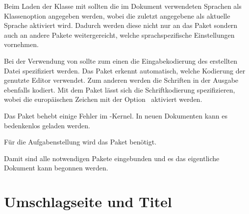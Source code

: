 \documentclass[english,ngerman]{tudscrartcl}
\begin{document}
Beim Laden der Klasse mit  sollten die im Dokument 
verwendeten Sprachen als Klassenoption angegeben werden, wobei die zuletzt 
angegebene als aktuelle Sprache aktiviert wird. Dadurch werden diese nicht nur 
an das Paket  sondern auch an andere Pakete weitergereicht, 
welche sprachspezifische Einstellungen vornehmen.
%
%
Bei der Verwendung von  sollte zum einen die Eingabekodierung 
des erstellten Datei spezifiziert werden. Das Paket  erkennt 
automatisch, welche Kodierung der genutzte Editor verwendet. Zum anderen werden 
die Schriften in der Ausgabe ebenfalls kodiert. Mit dem Paket  
lässt sich die Schriftkodierung spezifizieren, wobei die europäischen Zeichen 
mit der Option~ aktiviert werden.
%
\begin{Tutorial*}
\usepackage{selinput}
\usepackage[T1]{fontenc}
\end{Tutorial*}
%
Das Paket  behebt einige Fehler im -Kernel. In 
neuen Dokumenten kann es bedenkenlos geladen werden.
%
\begin{Tutorial*}
\usepackage{fixltx2e}
\end{Tutorial*}
%
Für die Aufgabenstellung wird das Paket  benötigt.
%
\begin{Tutorial*}
\usepackage{tudscrsupervisor}
\end{Tutorial*}
%
Damit sind alle notwendigen Pakete eingebunden und es das eigentliche Dokument 
kann begonnen werden.
\begin{Tutorial*}
\begin{document}
\end{Tutorial*}

\section{Umschlagseite und Titel}
\end{document}
